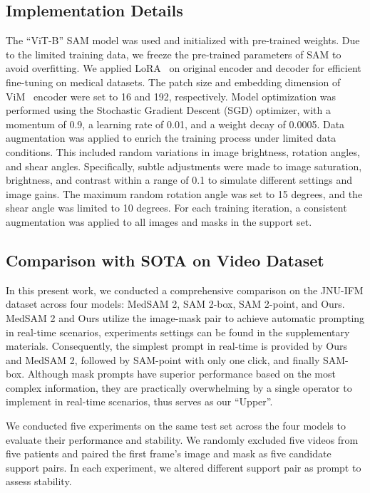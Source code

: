 \subsection{Implementation Details}
The ``ViT-B” SAM model was used and initialized with pre-trained weights. Due to the limited training data, we freeze the pre-trained parameters of SAM to avoid overfitting. We applied LoRA~\cite{hu2021lora} on original encoder and decoder for efficient fine-tuning on medical datasets. The patch size and embedding dimension of ViM~\cite{zhu2024vision} encoder were set to 16 and 192, respectively. Model optimization was performed using the Stochastic Gradient Descent (SGD) optimizer, with a momentum of 0.9, a learning rate of 0.01, and a weight decay of 0.0005.
Data augmentation was applied to enrich the training process under limited data conditions. This included random variations in image brightness, rotation angles, and shear angles. Specifically, subtle adjustments were made to image saturation, brightness, and contrast within a range of 0.1 to simulate different settings and image gains. The maximum random rotation angle was set to 15 degrees, and the shear angle was limited to 10 degrees. For each training iteration, a consistent augmentation was applied to all images and masks in the support set.

\subsection{Comparison with SOTA on Video Dataset}

In this present work, we conducted a comprehensive comparison on the JNU-IFM dataset across four models: MedSAM 2, SAM 2-box, SAM 2-point, and Ours. MedSAM 2 and Ours utilize the image-mask pair to achieve automatic prompting in real-time scenarios, experiments settings can be found in the supplementary materials. Consequently, the simplest prompt in real-time is provided by Ours and MedSAM 2, followed by SAM-point with only one click, and finally SAM-box. Although mask prompts have superior performance based on the most complex information, they are practically overwhelming by a single operator to implement in real-time scenarios, thus serves as our ``Upper''.

We conducted five experiments on the same test set across the four models to evaluate their performance and stability. We randomly excluded five videos from five patients and paired the first frame's image and mask as five candidate support pairs. In each experiment, we altered different support pair as prompt to assess stability.

